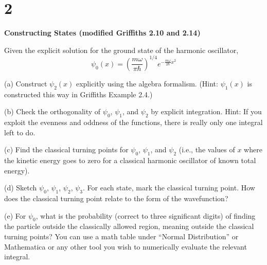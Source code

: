 \documentclass{article}
\begin{document}
\hfil

\section*{2}
\begin{ques}\label{q2}
\textbf{Constructing States (modified Griffiths 2.10 and 2.14)}

Given the explicit solution for the ground state of the harmonic oscillator,
\[
\psi_0(x) = \left(\frac{m\omega}{\pi \hbar}\right)^{1/4} e^{- \frac{m\omega}{2\hbar}x^2}
\]

(a) Construct $\psi_2(x)$ explicitly using the algebra formalism. (Hint: $\psi_1(x)$ is constructed
this way in Griffiths Example 2.4.)

(b) Check the orthogonality of $\psi_0$, $\psi_1$, and $\psi_2$ by explicit integration. Hint: If you exploit
the evenness and oddness of the functions, there is really only one integral left to
do.

(c) Find the classical turning points for $\psi_0$, $\psi_1$, and $\psi_2$ (i.e., the values of $x$ where the
kinetic energy goes to zero for a classical harmonic oscillator of known total energy).

(d) Sketch $\psi_0$, $\psi_1$, $\psi_2$, $\psi_3$. For each state, mark the classical turning point. How does the
classical turning point relate to the form of the wavefunction?

(e) For $\psi_0$, what is the probability (correct to three significant digits) of finding the
particle outside the classically allowed region, meaning outside the classical turning
points? You can use a math table under “Normal Distribution” or Mathematica or
any other tool you wish to numerically evaluate the relevant integral.
\end{ques}
\end{document}
